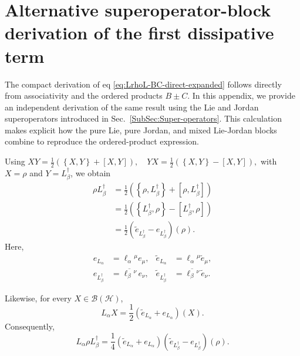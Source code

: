 \documentclass[notitlepage,aip,reprint,onecolumn]{revtex4-1}
\theoremstyle{definition}
\renewcommand{\comm}[2]{\left[#1,#2\right]}
\newcommand{\acom}[2]{\left\{#1,#2\right\}}
\begin{document}
\section{Alternative superoperator-block derivation of the first dissipative term}
\label{App:SuperoperatorBlocks}

The compact derivation of eq \eqref{eq:LrhoL-BC-direct-expanded} follows directly from associativity and the ordered products \(B\pm C\). In this appendix, we provide an independent derivation of the same result using the Lie and Jordan superoperators introduced in Sec.~\ref{SubSec:Super-operators}. This calculation makes explicit how the pure Lie, pure Jordan, and mixed Lie-Jordan blocks combine to reproduce the ordered-product expression.

Using
\(
XY
=
\frac12
\left(
\acom{X}{Y}
+
\comm{X}{Y}
\right),
\quad
YX
=
\frac12
\left(
\acom{X}{Y}
-
\comm{X}{Y}
\right),
\)
with \(X=\rho\) and \(Y=L_\beta^\dagger\), we obtain
\[
\begin{aligned}
\rho L_\beta^\dagger
&=
\frac12
\left(
\acom{\rho}{L_\beta^\dagger}
+
\comm{\rho}{L_\beta^\dagger}
\right)
\\
&=
\frac12
\left(
\acom{L_\beta^\dagger}{\rho}
-
\comm{L_\beta^\dagger}{\rho}
\right)
\\
&=
\frac12
\left(
\widetilde e_{L_\beta^\dagger}
-
e_{L_\beta^\dagger}
\right)(\rho).
\end{aligned}
\]
Here,
\[
\begin{aligned}
e_{L_\alpha}
&=
\ell_\alpha{}^\mu e_\mu,
&
\widetilde e_{L_\alpha}
&=
\ell_\alpha{}^\mu\widetilde e_\mu,
\\
e_{L_\beta^\dagger}
&=
\overline{\ell_\beta{}^\nu}\,e_\nu,
&
\widetilde e_{L_\beta^\dagger}
&=
\overline{\ell_\beta{}^\nu}\,\widetilde e_\nu.
\end{aligned}
\]

Likewise, for every \(X\in\mathcal B(\mathcal H)\),
\[
L_\alpha X
=
\frac12
\left(
\widetilde e_{L_\alpha}
+
e_{L_\alpha}
\right)(X).
\]
Consequently,
\begin{equation}\label{eq:App-LrhoL-factorized}
L_\alpha\rho L_\beta^\dagger
=
\frac14
\left(
\widetilde e_{L_\alpha}
+
e_{L_\alpha}
\right)
\left(
\widetilde e_{L_\beta^\dagger}
-
e_{L_\beta^\dagger}
\right)(\rho).
\end{equation}
\end{document}
